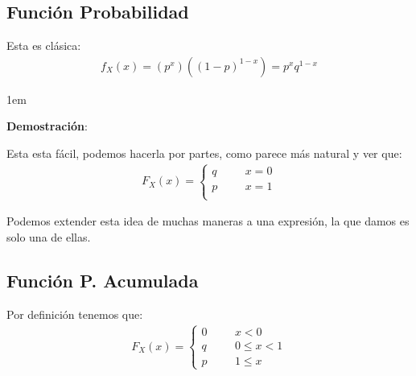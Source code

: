 \documentclass[12pt, fleqn]{report}                             %
\newenvironment{SmallIndentation}[1][0.75em]                    %
        {\begin{adjustwidth}{#1}{}\begin{footnotesize}}             %
        {\end{footnotesize}\end{adjustwidth}}                       %
\DeclareMathOperator \Space {\quad}                             %
\theoremstyle{break}                                            %
\begin{document}
            \subsection{Función Probabilidad}

                Esta es clásica:
                \begin{align*}
                    f_X(x) = (p^x) ((1-p)^{1-x}) = p^x q^{1-x}
                \end{align*}

                \begin{SmallIndentation}[1em]
                    \textbf{Demostración}:
                    
                    Esta esta fácil, podemos hacerla por partes, como parece
                    más natural y ver que:
                    \begin{align*}
                        F_X(x) = 
                            \begin{cases}
                                q \Space& x = 0             \\
                                p \Space& x = 1             \\
                            \end{cases}
                    \end{align*}

                    Podemos extender esta idea de muchas maneras a una expresión,
                    la que damos es solo una de ellas.
                
                \end{SmallIndentation}
                    
            \vspace{1em}
            \subsection{Función P. Acumulada}

                Por definición tenemos que:
                \begin{align*}
                    F_X(x) = 
                        \begin{cases}
                            0 \Space& x < 0             \\
                            q \Space& 0 \leq x < 1      \\
                            p \Space& 1 \leq x 
                        \end{cases}
                \end{align*}
\end{document}
